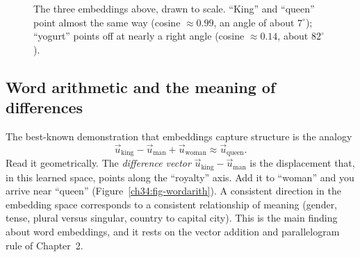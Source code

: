 \begin{figure}[htbp]
\centering
{}
\caption{The three embeddings above, drawn to scale. ``King''
and ``queen'' point almost the same way (cosine $\approx 0.99$, an angle of about
$7^\circ$); ``yogurt'' points off at nearly a right angle (cosine $\approx 0.14$, about
$82^\circ$).}
\label{ch34:fig-cosine}
\end{figure}

\subsection{Word arithmetic and the meaning of differences}

The best-known demonstration that embeddings capture structure is the analogy
\[
\vec{u}_{\text{king}} - \vec{u}_{\text{man}} + \vec{u}_{\text{woman}} \approx
\vec{u}_{\text{queen}}.
\]
Read it geometrically. The \emph{difference vector} $\vec{u}_{\text{king}} -
\vec{u}_{\text{man}}$ is the displacement that, in this learned space, points along the
``royalty'' axis. Add it to ``woman'' and you arrive near ``queen'' (Figure~\ref{ch34:fig-wordarith}).
A consistent direction in the embedding space corresponds to a consistent relationship
of meaning (gender, tense, plural versus singular, country to capital city). This is the
main finding about word embeddings, and it rests on the vector addition and parallelogram
rule of Chapter~2.

